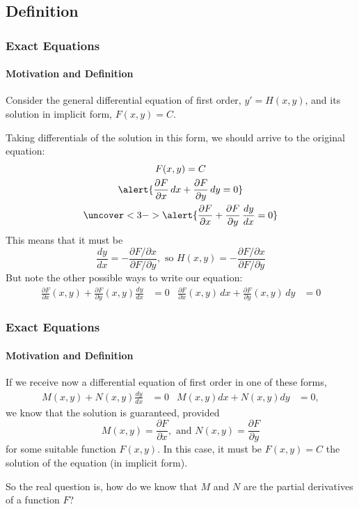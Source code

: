 \documentclass[10pt,xcolor=x11names,compress]{beamer}
\begin{document}
\subsection{Definition}
\begin{frame}\frametitle{Exact Equations}
\framesubtitle{Motivation and Definition}
Consider the general differential equation of first order, $y'=H(x,y)$, and its solution in implicit form, $F(x,y)=C$.

\pause Taking differentials of the solution in this form, we should arrive to the original equation:
\begin{gather*}
	F(x,y)=C \\
	\alert{\frac{\partial F}{\partial x}\, dx + \frac{\partial F}{\partial y}\,  dy = 0} \\
	\uncover<3->{\alert{\frac{\partial F}{\partial x} + \frac{\partial F}{\partial y}\, \frac{dy}{dx} = 0}}
\end{gather*}
\pause\pause This means that it must be
\begin{equation*}
	\frac{dy}{dx} = -\frac{\partial F/\partial x}{\partial F/\partial y}, \text{ so } H(x,y) = -\frac{\partial F/\partial x}{\partial F/\partial y}
\end{equation*}
\pause But note the other possible ways to write our equation:
\begin{align*}
	\frac{\partial F}{\partial x}(x,y)+\frac{\partial F}{\partial y}(x,y) \frac{dy}{dx} &= 0 & \frac{\partial F}{\partial x}(x,y)\, dx + \frac{\partial F}{\partial y}(x,y)\, dy &=0
\end{align*}
\end{frame}

\begin{frame}\frametitle{Exact Equations}
\framesubtitle{Motivation and Definition}
If we receive now a differential equation of first order in one of these forms,
\begin{align*}
	M(x,y)+N(x,y)\frac{dy}{dx}&=0 & M(x,y)dx + N(x,y)dy &=0,
\end{align*}
we know that the solution is guaranteed, provided 
\begin{equation*}
	M(x,y) = \frac{\partial F}{\partial x}, \text{ and } N(x,y)=\frac{\partial F}{\partial y}
\end{equation*}
for some suitable function $F(x,y)$.  In this case, it must be $F(x,y)=C$ the solution of the equation (in implicit form).

\pause So the real question is, \alert{how do we know that $M$ and $N$ are the partial derivatives of a function $F$?}
\end{frame}
\end{document}
